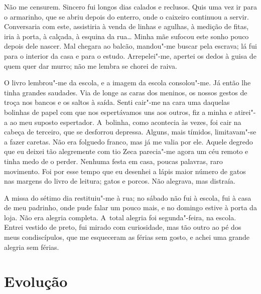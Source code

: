 \begin{linenumbers}
Não me censurem. Sincero fui longos dias calados e reclusos. Quis uma
vez ir para o armarinho, que se abriu depois do enterro, onde o caixeiro
continuou a servir. Conversaria com este, assistiria à venda de linhas e
agulhas, à medição de fitas, iria à porta, à calçada, à esquina da
rua\ldots{} Minha mãe sufocou este sonho pouco depois dele nascer. Mal
chegara ao balcão, mandou"-me buscar pela escrava; lá fui para o interior
da casa e para o estudo. Arrepelei"-me, apertei os dedos à guisa de quem
quer dar murro; não me lembra se chorei de raiva.

O livro lembrou"-me da escola, e a imagem da escola consolou"-me. Já então
lhe tinha grandes saudades. Via de longe as caras dos meninos, os nossos
gestos de troça nos bancos e os saltos à saída. Senti cair"-me na cara
uma daquelas bolinhas de papel com que nos espertávamos uns aos outros,
fiz a minha e atirei"-a ao meu suposto espertador. A~bolinha, como
acontecia às vezes, foi cair na cabeça de terceiro, que se desforrou
depressa. Alguns, mais tímidos, limitavam"-se a fazer caretas. Não era
folguedo franco, mas já me valia por ele. Aquele degredo que eu deixei
tão alegremente com tio Zeca parecia"-me agora um céu remoto e tinha medo
de o perder. Nenhuma festa em casa, poucas palavras, raro movimento. Foi
por esse tempo que eu desenhei a lápis maior número de gatos nas margens
do livro de leitura; gatos e porcos. Não alegrava, mas distraía.

A missa do sétimo dia restituiu"-me à rua; no sábado não fui à escola,
fui à casa de meu padrinho, onde pude falar um pouco mais, e no domingo
estive à porta da loja. Não era alegria completa. A~total alegria foi
segunda"-feira, na escola. Entrei vestido de preto, fui mirado com
curiosidade, mas tão outro ao pé dos meus condiscípulos, que me
esqueceram as férias sem gosto, e achei uma grande alegria sem férias.

\end{linenumbers}

\chapter{Evolução}

